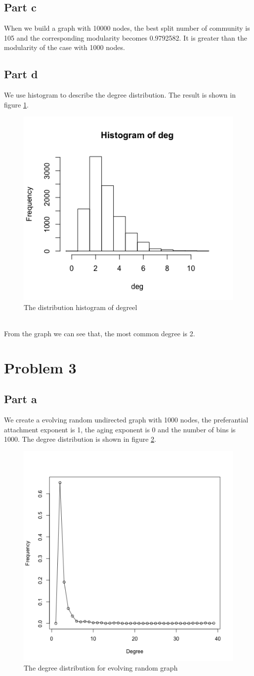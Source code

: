 \documentclass{article}
\begin{document}
\subsection{Part c}
When we build a graph with 10000 nodes, the best split number of community is 105 and the corresponding modularity becomes 0.9792582.
It is greater than the modularity of the case with 1000 nodes.
\subsection{Part d}
We use histogram to describe the degree distribution. The result is shown in figure \ref{fig:p2_3}. \\
\begin{figure}[htbp]
\centering
\includegraphics[width=.6\textwidth]{p2_4.png}
\caption{The distribution histogram of degreel}
\label{fig:p2_3}
\end{figure}
\\
From the graph we can see that, the most common degree is 2.\\

\section{Problem 3}
\subsection{Part a}
We create a evolving random undirected graph with 1000 nodes, the preferantial attachment exponent is 1, the aging exponent is 0 and the number of bins is 1000. The degree distribution is shown in figure \ref{fig:p3_1}.
\begin{figure}[htbp]
\centering
\includegraphics[width=.6\textwidth]{p3_1.png}
\caption{The degree distribution for evolving random graph}
\label{fig:p3_1}
\end{figure}
\end{document}

